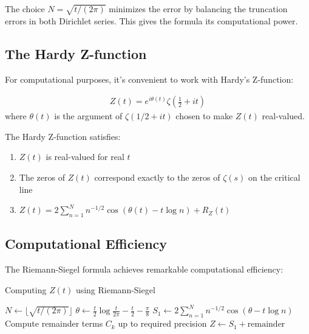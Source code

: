 \begin{remark}
The choice $N = \sqrt{t/(2\pi)}$ minimizes the error by balancing the truncation errors in both Dirichlet series. This gives the formula its computational power.
\end{remark}

\subsection{The Hardy Z-function}

For computational purposes, it's convenient to work with Hardy's Z-function:

\begin{definition}
\begin{align}
Z(t) = e^{i\theta(t)} \zeta\left(\frac{1}{2} + it\right)
\end{align}
where $\theta(t)$ is the argument of $\zeta(1/2 + it)$ chosen to make $Z(t)$ real-valued.
\end{definition}

\begin{theorem}
The Hardy Z-function satisfies:
\begin{enumerate}
\item $Z(t)$ is real-valued for real $t$
\item The zeros of $Z(t)$ correspond exactly to the zeros of $\zeta(s)$ on the critical line
\item $Z(t) = 2\sum_{n=1}^{N} n^{-1/2} \cos(\theta(t) - t\log n) + R_Z(t)$
\end{enumerate}
\end{theorem}

\subsection{Computational Efficiency}

The Riemann-Siegel formula achieves remarkable computational efficiency:

\begin{algorithm}[H]
\caption{Computing $Z(t)$ using Riemann-Siegel}
\begin{algorithmic}
\State $N \leftarrow \lfloor\sqrt{t/(2\pi)}\rfloor$
\State $\theta \leftarrow \frac{t}{2}\log\frac{t}{2\pi} - \frac{t}{2} - \frac{\pi}{8}$
\State $S_1 \leftarrow 2\sum_{n=1}^{N} n^{-1/2} \cos(\theta - t\log n)$
\State Compute remainder terms $C_k$ up to required precision
\State $Z \leftarrow S_1 + \text{remainder}$
\end{algorithmic}
\end{algorithm}

